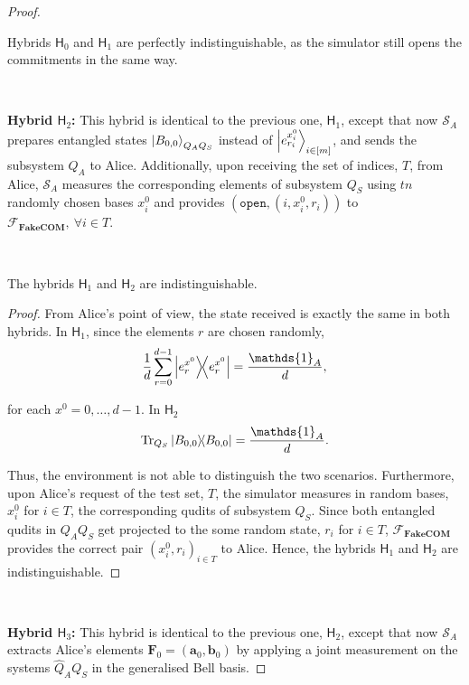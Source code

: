 \begin{proof}
\ 

 Hybrids $\mathsf{H}_0$ and $ \mathsf{H}_1$ are perfectly indistinguishable, as the simulator still opens the commitments in the same way.

\

\textbf{Hybrid $\mathsf{H}_2$:} This hybrid is identical to the previous one, $ \mathsf{H}_1$, except that now $\mathcal{S}_A$ prepares entangled states $\ket{B_{0,0}}_{Q_A Q_S}$ instead of $\ket{e^{x^0_i}_{r_i}}_{ i\in [m]}$, and sends the subsystem $Q_A$ to Alice. Additionally, upon receiving  the set of indices, $T$, from Alice, $\mathcal{S}_A$  measures the corresponding elements of subsystem $Q_S$ using $tn$ randomly chosen bases $x^0_i$ and provides $(\texttt{open}, (i, x^0_i, r_i))$ to  $\mathcal{F}_{\textbf{FakeCOM}},\ \forall i\in T$.


\

\begin{claim}
The hybrids $\mathsf{H}_1$ and $\mathsf{H}_2$ are indistinguishable.
\label{claim:h1h2Alice}
\end{claim}
\begin{proof}
From Alice's point of view, the state received  is exactly the same in both hybrids. In $\mathsf{H}_1$, since the elements $r$  are chosen randomly,
\begin{equation*}
    \frac{1}{d}\sum_{r=0}^{d-1} \ketbra{e^{x^0}_{r}} = \frac{\mathds{1}_A}{d},
\end{equation*}

for each $x^0 = 0, \ldots, d-1$. In $\mathsf{H}_2$
\begin{equation*}
    \Tr_{Q_S}{\ketbra{B_{0,0}}} = \frac{\mathds{1}_A}{d}.
\end{equation*}

Thus, the environment is not able to distinguish the two scenarios. Furthermore, upon Alice's request of the test set, $T$, the simulator  measures in random bases, $x^0_i$  for $i\in T$, the corresponding qudits of subsystem $Q_S$. Since both entangled qudits in $Q_A Q_S$ get projected to the some random state, $r_i$  for $i\in T$,  $\mathcal{F}_{\textbf{FakeCOM}}$  provides the correct pair $(x^0_i, r_i)_{ i\in T}$ to Alice. Hence, the hybrids $\mathsf{H}_1$ and $\mathsf{H}_2$ are indistinguishable.
\end{proof}

\

\textbf{Hybrid $\mathsf{H}_3$:} This hybrid is identical to the previous one, $\mathsf{H}_2$, except that now $\mathcal{S}_A$ extracts Alice's elements $\mathbf{F}_0 = (\bm{a}_0, \bm{b}_0)$  by applying a joint measurement on the systems $\hat{Q}_A Q_S$ in the generalised Bell basis.


\end{proof}
